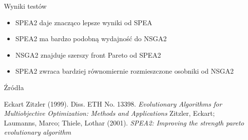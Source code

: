 \documentclass{beamer}
\begin{document}
\begin{frame}{Wyniki testów}
\begin{itemize}
    \item SPEA2 daje znacząco lepsze wyniki od SPEA
    \item SPEA2 ma bardzo podobną wydajność do NSGA2
    \item NSGA2 znajduje szerszy front Pareto od SPEA2
    \item SPEA2 zwraca bardziej równomiernie rozmieszczone osobniki od NSGA2
\end{itemize}
\end{frame}



\begin{frame}{Źródła}
\begin{thebibliography}{9}
Eckart Zitzler (1999). Diss. ETH No. 13398. \textit{Evolutionary Algorithms for Multiobjective Optimization: Methods and Applications}
Zitzler, Eckart; Laumanns, Marco; Thiele, Lothar (2001). \textit{SPEA2: Improving the strength pareto evolutionary algorithm}
\end{thebibliography}
\end{frame}
\end{document}
